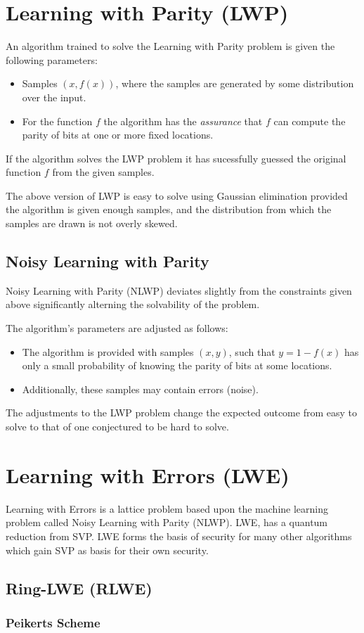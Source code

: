 \section{Learning with Parity (LWP)}

An algorithm trained to solve the Learning with Parity problem is given the following parameters:
\begin{itemize}
	\item Samples $(x, f(x))$, where the samples are generated by some distribution over the input.
	\item For the function $f$ the algorithm has the \emph{assurance} that $f$ can compute the parity of bits at one or more fixed locations.
\end{itemize}

If the algorithm solves the LWP problem it has sucessfully guessed the original function $f$ from the given samples.

The above version of LWP is easy to solve using Gaussian elimination provided the algorithm is given enough samples, and the distribution from which the samples are drawn is not overly skewed. 

\subsection{Noisy Learning with Parity}

Noisy Learning with Parity (NLWP) deviates slightly from the constraints given above significantly alterning the solvability of the problem. 

The algorithm's parameters are adjusted as follows:
\begin{itemize}
	\item The algorithm is provided with samples $(x,y)$, such that $y = 1- f(x)$ has only a small probability of knowing the parity of bits at some locations. 
	\item Additionally, these samples may contain errors (noise).
\end{itemize}

The adjustments to the LWP problem change the expected outcome from easy to solve to that of one conjectured to be hard to solve. 

\section{Learning with Errors (LWE)}

Learning with Errors is a lattice problem based upon the machine learning problem called Noisy Learning with Parity (NLWP). 
LWE, has a quantum reduction from SVP. LWE forms the basis of security for many other algorithms which gain SVP as basis for their own security.

\subsection{Ring-LWE (RLWE)}



\subsubsection{Peikerts Scheme}